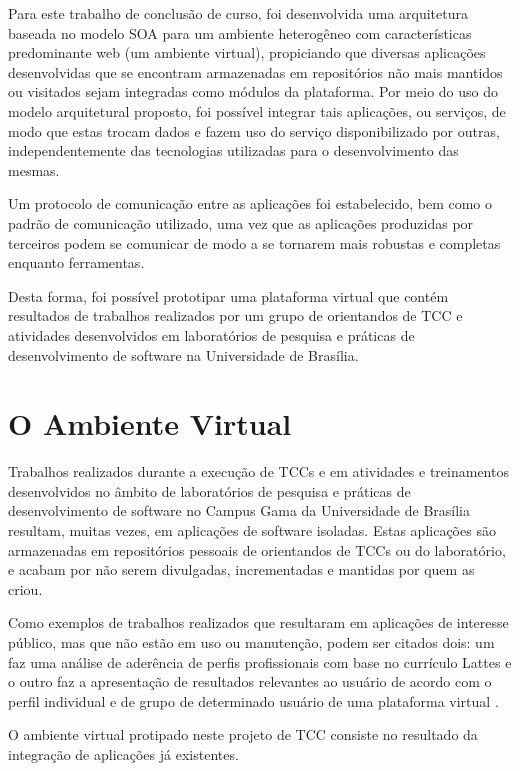 Para este trabalho de conclusão de curso, foi desenvolvida uma arquitetura baseada no modelo SOA para um ambiente heterogêneo com características predominante web (um ambiente virtual), propiciando que diversas aplicações desenvolvidas que se encontram armazenadas em repositórios não mais mantidos ou visitados sejam integradas como módulos da plataforma. Por meio do uso do modelo arquitetural proposto, foi possível integrar tais aplicações, ou serviços, de modo que estas trocam dados e fazem uso do serviço disponibilizado por outras, independentemente das tecnologias utilizadas para o desenvolvimento das mesmas.

Um protocolo de comunicação entre as aplicações foi estabelecido, bem como o padrão de comunicação utilizado, uma vez que as aplicações produzidas por terceiros podem se comunicar de modo a se tornarem mais robustas e completas enquanto ferramentas.

Desta forma, foi possível prototipar uma plataforma virtual que contém resultados de trabalhos realizados por um grupo de orientandos de TCC e atividades desenvolvidos em laboratórios de pesquisa e práticas de desenvolvimento de software na Universidade de Brasília.

\section{O Ambiente Virtual}

Trabalhos realizados durante a execução de TCCs e em atividades e treinamentos desenvolvidos no âmbito de laboratórios de pesquisa e práticas de desenvolvimento de software no Campus Gama da Universidade de Brasília resultam, muitas vezes, em aplicações de software isoladas. Estas aplicações são armazenadas em repositórios pessoais de orientandos de TCCs ou do laboratório, e acabam por não serem divulgadas, incrementadas e mantidas por quem as criou.

Como exemplos de trabalhos realizados que resultaram em aplicações de interesse público, mas que não estão em uso ou manutenção, podem ser citados dois: um faz uma análise de aderência de perfis profissionais com base no currículo Lattes \cite{jesus_algoritmo_2014} e o outro faz a apresentação de resultados relevantes ao usuário de acordo com o perfil individual e de grupo de determinado usuário de uma plataforma virtual \cite{carvalho_sistema_2014}.

O ambiente virtual protipado neste projeto de TCC consiste no resultado da integração de aplicações já existentes.

